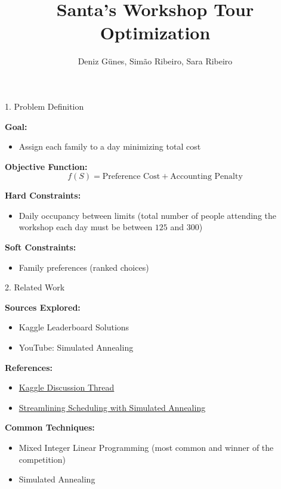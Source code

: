 \documentclass[aspectratio=169]{beamer}
\title{Santa's Workshop Tour Optimization}
\author{Deniz Günes, Simão Ribeiro, Sara Ribeiro}
\begin{document}
\frame{\titlepage}


\begin{frame}{1. Problem Definition}

\textbf{Goal:}
\begin{itemize}
    \item Assign each family to a day minimizing total cost
\end{itemize}

\textbf{Objective Function:}
\[
f(S) = \text{Preference Cost} + \text{Accounting Penalty}
\]

\textbf{Hard Constraints:}
\begin{itemize}
    \item Daily occupancy between limits (total number of people attending the workshop each day must be between $125$ and $300$)
\end{itemize}

\textbf{Soft Constraints:}
\begin{itemize}
    \item Family preferences (ranked choices)
\end{itemize}

\end{frame}


\begin{frame}{2. Related Work}

\textbf{Sources Explored:}
\begin{itemize}
    \item Kaggle Leaderboard Solutions
    \item YouTube: Simulated Annealing
\end{itemize}

\vspace{0.3cm}

\textbf{References:}
\begin{itemize}
    \item \href{https://www.kaggle.com/competitions/santa-workshop-tour-2019/writeups/felixoneberlin-how-to-win-santa-s-workshop-tour}{Kaggle Discussion Thread}
    \item \href{https://www.youtube.com/watch?v=klrmv7nuSX4}{Streamlining Scheduling with Simulated Annealing }
\end{itemize}

\vspace{0.3cm}

\textbf{Common Techniques:}
\begin{itemize}
    \item Mixed Integer Linear Programming (most common and winner of the competition)
    \item Simulated Annealing
\end{itemize}

\end{frame}
\end{document}
